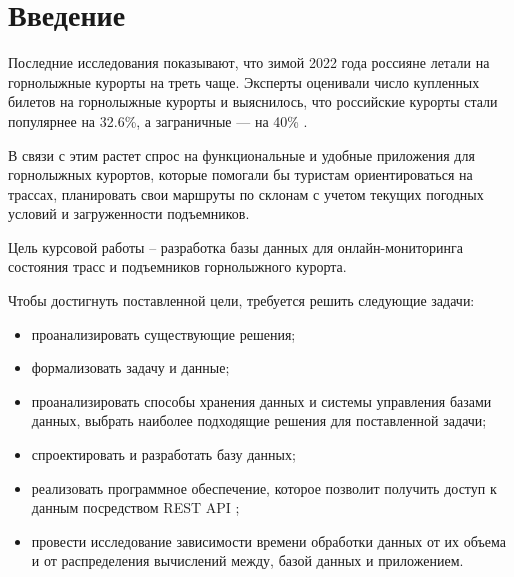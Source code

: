 \chapter*{Введение}

Последние исследования показывают, что зимой 2022 года россияне летали на горнолыжные курорты на треть чаще. Эксперты оценивали число купленных билетов на горнолыжные курорты и выяснилось, что российские курорты стали популярнее на 32.6\%, а заграничные — на 40\% \cite{stat}.

В связи с этим растет спрос на функциональные и удобные приложения для горнолыжных курортов, которые помогали бы туристам ориентироваться на трассах, планировать свои маршруты по склонам с учетом текущих погодных условий и загруженности подъемников.

Цель курсовой работы -- разработка базы данных для онлайн-мониторинга состояния трасс и подъемников горнолыжного курорта. 



Чтобы достигнуть поставленной цели, требуется решить следующие задачи:

\begin{itemize}
	\item проанализировать существующие решения;
	\item формализовать задачу и данные;
	\item проанализировать способы хранения данных и системы управления базами данных, выбрать наиболее подходящие решения для поставленной задачи;
	\item спроектировать и разработать базу данных;
    \item  реализовать программное обеспечение, которое позволит получить доступ к данным посредством REST API \cite{api};
    \item провести исследование зависимости времени обработки данных от их объема и от распределения вычислений между, базой данных и приложением.
\end{itemize}

